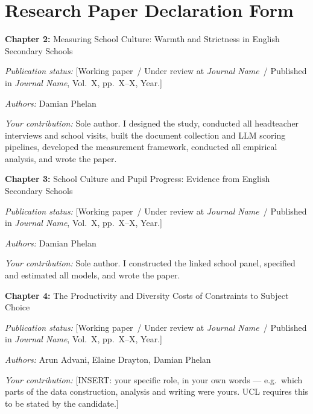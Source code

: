 \chapter*{Research Paper Declaration Form}

%

\noindent\textbf{Chapter 2:} Measuring School Culture: Warmth and Strictness in
English Secondary Schools

\noindent\textit{Publication status:}
[Working paper~/ Under review at \textit{Journal Name}~/ Published in
\textit{Journal Name}, Vol.~X, pp.~X--X, Year.]

\noindent\textit{Authors:} Damian Phelan

\noindent\textit{Your contribution:} Sole author. I designed the study,
conducted all headteacher interviews and school visits, built the document
collection and LLM scoring pipelines, developed the measurement framework,
conducted all empirical analysis, and wrote the paper.

\bigskip
\noindent\textbf{Chapter 3:} School Culture and Pupil Progress: Evidence from
English Secondary Schools

\noindent\textit{Publication status:}
[Working paper~/ Under review at \textit{Journal Name}~/ Published in
\textit{Journal Name}, Vol.~X, pp.~X--X, Year.]

\noindent\textit{Authors:} Damian Phelan

\noindent\textit{Your contribution:} Sole author. I constructed the linked
school panel, specified and estimated all models, and wrote the paper.

\bigskip
\noindent\textbf{Chapter 4:} The Productivity and Diversity Costs of
Constraints to Subject Choice

\noindent\textit{Publication status:}
[Working paper~/ Under review at \textit{Journal Name}~/ Published in
\textit{Journal Name}, Vol.~X, pp.~X--X, Year.]

\noindent\textit{Authors:} Arun Advani, Elaine Drayton, Damian Phelan

\noindent\textit{Your contribution:} [INSERT: your specific role, in your
own words --- e.g.\ which parts of the data construction, analysis and
writing were yours. UCL requires this to be stated by the candidate.]
